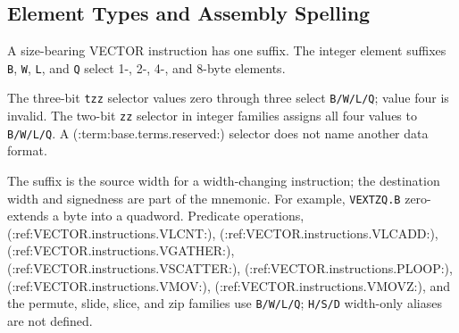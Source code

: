 \subsection{Element Types and Assembly Spelling}

A size-bearing VECTOR instruction has one suffix. The integer element
suffixes \texttt{B}, \texttt{W}, \texttt{L}, and \texttt{Q} select 1-, 2-,
4-, and 8-byte elements.

The three-bit \texttt{tzz} selector values zero through three select
\texttt{B/W/L/Q}; value four is invalid. The two-bit \texttt{zz} selector in
integer families assigns all four values to \texttt{B/W/L/Q}. A
(:term:base.terms.reserved:) selector does not name another data format.

The suffix is the source width for a width-changing instruction; the
destination width and signedness are part of the mnemonic. For example,
\texttt{VEXTZQ.B} zero-extends a byte into a quadword. Predicate
operations, (:ref:VECTOR.instructions.VLCNT:), (:ref:VECTOR.instructions.VLCADD:), (:ref:VECTOR.instructions.VGATHER:),
(:ref:VECTOR.instructions.VSCATTER:), (:ref:VECTOR.instructions.PLOOP:), (:ref:VECTOR.instructions.VMOV:), (:ref:VECTOR.instructions.VMOVZ:),
and the permute, slide, slice, and zip families use \texttt{B/W/L/Q};
\texttt{H/S/D} width-only aliases are not defined.

